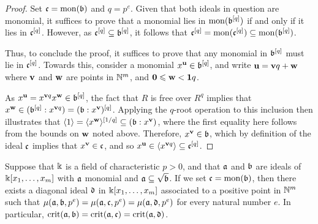 \documentclass{amsart}
\begin{document}
\begin{proof}  Set $\mathfrak{c} = \operatorname{mon}(\mathfrak{b})$ and $q=p^e$.  Given that both ideals in question are monomial, it suffices to prove that a monomial lies in $\operatorname{mon}(\mathfrak{b}^{[q]})$ if and only if it lies in $\mathfrak{c}^{[q]}$.  However, as $\mathfrak{c}^{[q]} \subseteq \mathfrak{b}^{[q]}$, it follows that
$\mathfrak{c}^{[q]} = \operatorname{mon}(\mathfrak{c}^{[q]}) \subseteq \operatorname{mon}(\mathfrak{b}^{[q]})$.

Thus, to conclude the proof, it suffices to prove that any monomial in $\mathfrak{b}^{[q]}$ must lie in $\mathfrak{c}^{[q]}$.  Towards this, consider a monomial $x^{\mathbf{u}} \in \mathfrak{b}^{[q]}$, and write $\mathbf{u} = \mathbf{v}q + \mathbf{w}$ where $\mathbf{v}$ and $\mathbf{w}$ are points in $\mathbb{N}^m$, and $\mathbf{0} \leqslant \mathbf{w} < \mathbf{1}q$.

As $x^{\mathbf{u}} = x^{\mathbf{v}q} x^{\mathbf{w}} \in \mathfrak{b}^{[q]}$, the fact that $R$ is free over $R^q$ implies that $x^{\mathbf{w}} \in ( \mathfrak{b}^{[q]}: x^{\mathbf{v}q}) = (\mathfrak{b}:x^{\mathbf{v}})^{[q]}$.  Applying the $q$-root operation to this inclusion then illustrates that $\langle 1 \rangle = \langle x^{\mathbf{w}} \rangle^{[1/q]}  \subseteq (\mathfrak{b}: x^{\mathbf{v}})$,  where the first equality here follows from the bounds on $\mathbf{w}$ noted above.   Therefore, $x^{\mathbf{v}} \in \mathfrak{b}$, which by definition of the ideal $\mathfrak{c}$ implies that $x^{\mathbf{v}} \in \mathfrak{c}$, and so $x^{\mathbf{u}} \in \langle x^{\mathbf{v}q} \rangle \subseteq \mathfrak{c}^{[q]}$.
\end{proof}


\begin{theorem}
\label{reduce-to-monomial-case: C}
Suppose that $\Bbbk$ is a field of characteristic $p>0$, and that $\mathfrak{a}$ and $\mathfrak{b}$ are ideals of $\Bbbk[x_1, \ldots, x_m]$ with $\mathfrak{a}$ monomial and $\mathfrak{a} \subseteq \sqrt{\mathfrak{b}}$.  If we set $\mathfrak{c} = \operatorname{mon}(\mathfrak{b})$,  then there exists a diagonal ideal $\mathfrak{d}$ in $\Bbbk[x_1, \ldots, x_m]$ associated to a positive point in $\mathbb{N}^m$ such that $\mu(\mathfrak{a}, \mathfrak{b}, p^e) = \mu(\mathfrak{a}, \mathfrak{c}, p^e) = \mu(\mathfrak{a}, \mathfrak{d}, p^e)$ for every natural number $e$.  In particular, $\operatorname{crit}(\mathfrak{a},\mathfrak{b}) = \operatorname{crit}(\mathfrak{a}, \mathfrak{c}) = \operatorname{crit}(\mathfrak{a}, \mathfrak{d})$.
\end{theorem}
\end{document}

